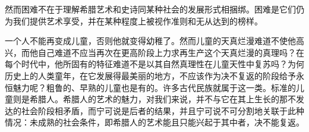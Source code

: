 \documentclass[a4paper,twoside,12pt]{ctexart}
\begin{document}
然而困难不在于理解希腊艺术和史诗同某种社会的发展形式相捆绑。困难是它们仍为我们提供艺术享受，并在某种程度上被视作准则和无从达到的榜样。

一个人不能再变成儿童，否则他就变得幼稚了。然而儿童的天真烂漫难道不使他高兴，而他自己难道不应当再次在更高阶段上力求再生产这个天真烂漫的真理吗？在每个时代中，他所固有的特征难道不是以其自然真理性在儿童天性中复苏吗？为何历史上的人类童年，在它发展得最美丽的地方，不应该作为决不复返的阶段给予永恒魅力呢？粗鲁的、早熟的儿童也是有的。许多古代民族就属于这一类。标准的儿童则是希腊人。希腊人的艺术的魅力，对我们来说，并不与它在其上生长的那不发达的社会阶段相矛盾，而宁可说是后者的结果，并且宁可说不可分割地关联于此种情况：未成熟的社会条件，即希腊人的艺术能且只能兴起于其中者，决不能复返。
\end{document}
